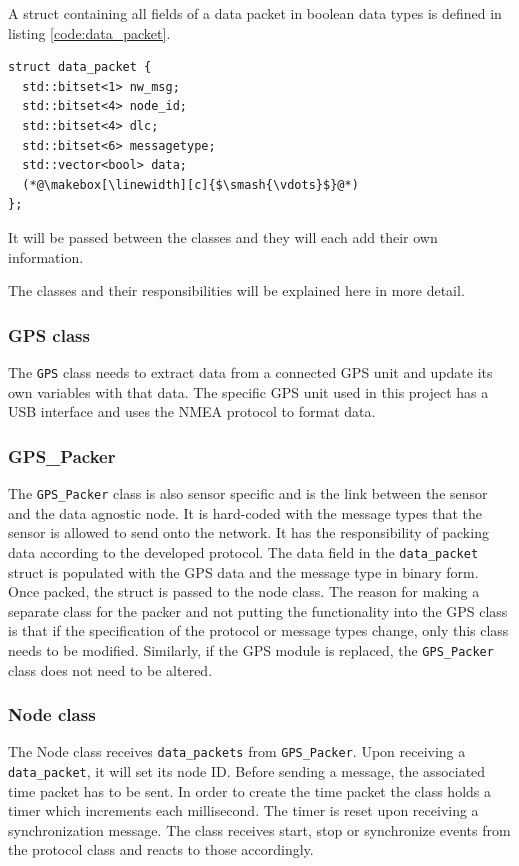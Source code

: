 A struct containing all fields of a data packet in boolean data types is defined in listing \ref{code:data_packet}.  

\begin{lstlisting}[caption=Struct for data packet.,label=code:data_packet]
struct data_packet {
  std::bitset<1> nw_msg;
  std::bitset<4> node_id;
  std::bitset<4> dlc;
  std::bitset<6> messagetype;
  std::vector<bool> data; 
  (*@\makebox[\linewidth][c]{$\smash{\vdots}$}@*)
};
\end{lstlisting}
It will be passed between the classes and they will each add their own information. 

The classes and their responsibilities will be explained here in more detail.

\subsubsection*{GPS class}
The \texttt{GPS} class needs to extract data from a connected GPS unit and update its own variables with that data.
The specific GPS unit used in this project has a USB interface and uses the NMEA protocol to format data.

\subsubsection*{GPS\_Packer}
The \texttt{GPS\_Packer} class is also sensor specific and is the link between the sensor and the data agnostic node.
It is hard-coded with the message types that the sensor is allowed to send onto the network.
It has the responsibility of packing data according to the developed protocol.
The data field in the \texttt{data\_packet} struct is populated with the GPS data and the message type in binary form.
Once packed, the struct is passed to the node class.
The reason for making a separate class for the packer and not putting the functionality into the GPS class is that if the specification of the protocol or message types change, only this class needs to be modified.
Similarly, if the GPS module is replaced, the \texttt{GPS\_Packer} class does not need to be altered.

\subsubsection*{Node class}
The Node class receives \texttt{data\_packets} from \texttt{GPS\_Packer}.
Upon receiving a \texttt{data\_packet}, it will set its node ID.
Before sending a message, the associated time packet has to be sent.
In order to create the time packet the class holds a timer which increments each millisecond.
The timer is reset upon receiving a synchronization message.
The class receives start, stop or synchronize events from the protocol class and reacts to those accordingly.

